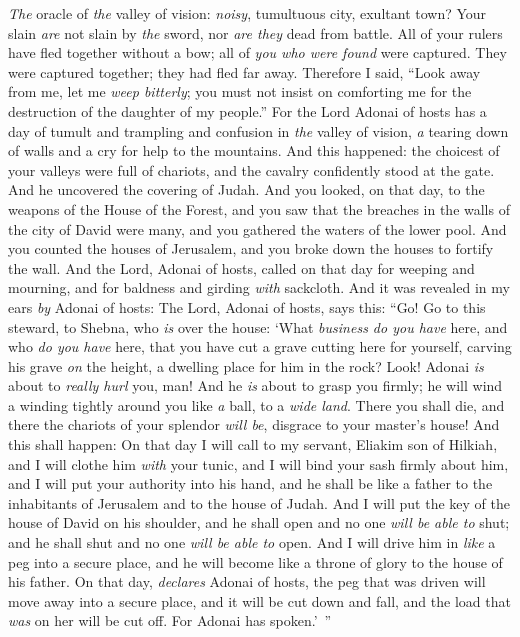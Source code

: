 \begin{biblechapter} %
 \textit{The} oracle of \textit{the} valley of vision:
\verse \textit{noisy}, tumultuous city, 
exultant town? 
Your slain \textit{are} not slain by \textit{the} sword, 
nor \textit{are they} dead from battle.
\verse All of your rulers have fled together without a bow; 
all of \textit{you who were found} were captured. 
They were captured together; 
they had fled far away.
\verse Therefore I said,
\verse “Look away from me, 
let me \textit{weep bitterly}; 
you must not insist on comforting me 
for the destruction of the daughter of my people.”
\verse For the Lord Adonai of hosts has a day of tumult and trampling and confusion in \textit{the} valley of vision, 
\textit{a} tearing down of walls and a cry for help to the mountains.
\verse And this happened:
\verse the choicest of your valleys were full of chariots, 
and the cavalry confidently stood at the gate.
\verse And he uncovered the covering of Judah. 
And you looked, on that day, to the weapons of the House of the Forest,
\verse and you saw that the breaches in the walls of the city of David were many, 
and you gathered the waters of the lower pool.
\verse And you counted the houses of Jerusalem, 
and you broke down the houses to fortify the wall.
\verse And the Lord, Adonai of hosts, called on that day
\verse for weeping and mourning, 
and for baldness and girding \textit{with} sackcloth.
\verse And it was revealed in my ears \textit{by} Adonai of hosts:
 The Lord, Adonai of hosts, says this:
\verse “Go! Go to this steward, to Shebna, 
who \textit{is} over the house:
\verse ‘What \textit{business do you have} here, 
and who \textit{do you have} here, 
that you have cut a grave cutting here for yourself, 
carving his grave \textit{on} the height, 
a dwelling place for him in the rock?
\verse Look! Adonai \textit{is} about to \textit{really hurl} you, man! 
And he \textit{is} about to grasp you firmly;
\verse he will wind a winding tightly around you like \textit{a} ball, to a \textit{wide land}. 
There you shall die, 
and there the chariots of your splendor \textit{will be}, 
disgrace to your master’s house!
\verse And this shall happen:
\verse On that day I will call to my servant, Eliakim son of Hilkiah,
\verse and I will clothe him \textit{with} your tunic, 
and I will bind your sash firmly about him, 
and I will put your authority into his hand, 
and he shall be like a father to the inhabitants of Jerusalem 
and to the house of Judah.
\verse And I will put the key of the house of David on his shoulder, 
and he shall open and no one \textit{will be able to} shut; 
and he shall shut and no one \textit{will be able to} open.
\verse And I will drive him in \textit{like} a peg into a secure place, 
and he will become like a throne of glory to the house of his father.
\verse On that day, \textit{declares} Adonai of hosts, the peg that was driven will move away into a secure place, and it will be cut down and fall, and the load that \textit{was} on her will be cut off. For Adonai has spoken.’ ”
\end{biblechapter}

